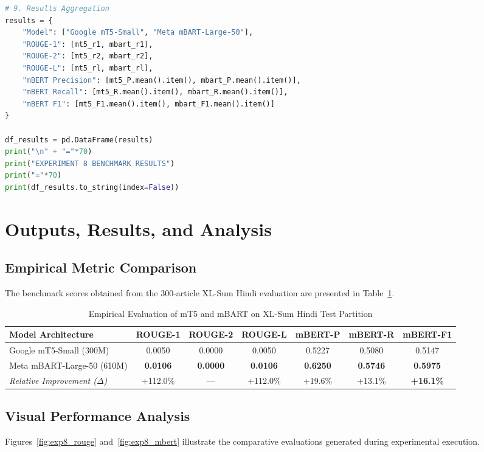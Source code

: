 \documentclass[12pt,a4paper]{report}
\begin{document}
\begin{lstlisting}[language=Python, caption={Complete Implementation of Experiment 8: Hindi Abstractive Summarization with mT5 and mBART}, label={lst:exp8_full}]
# 9. Results Aggregation
results = {
    "Model": ["Google mT5-Small", "Meta mBART-Large-50"],
    "ROUGE-1": [mt5_r1, mbart_r1],
    "ROUGE-2": [mt5_r2, mbart_r2],
    "ROUGE-L": [mt5_rl, mbart_rl],
    "mBERT Precision": [mt5_P.mean().item(), mbart_P.mean().item()],
    "mBERT Recall": [mt5_R.mean().item(), mbart_R.mean().item()],
    "mBERT F1": [mt5_F1.mean().item(), mbart_F1.mean().item()]
}

df_results = pd.DataFrame(results)
print("\n" + "="*70)
print("EXPERIMENT 8 BENCHMARK RESULTS")
print("="*70)
print(df_results.to_string(index=False))
\end{lstlisting}

\section{Outputs, Results, and Analysis}
\subsection{Empirical Metric Comparison}
The benchmark scores obtained from the 300-article XL-Sum Hindi evaluation are presented in Table~\ref{tab:exp8_results}.

\begin{table}[H]
\centering
\caption{Empirical Evaluation of mT5 and mBART on XL-Sum Hindi Test Partition}
\label{tab:exp8_results}
\begin{tabular}{lcccccc}
\toprule
\textbf{Model Architecture} & \textbf{ROUGE-1} & \textbf{ROUGE-2} & \textbf{ROUGE-L} & \textbf{mBERT-P} & \textbf{mBERT-R} & \textbf{mBERT-F1} \\
\midrule
Google mT5-Small (300M) & 0.0050 & 0.0000 & 0.0050 & 0.5227 & 0.5080 & 0.5147 \\
Meta mBART-Large-50 (610M) & \textbf{0.0106} & \textbf{0.0000} & \textbf{0.0106} & \textbf{0.6250} & \textbf{0.5746} & \textbf{0.5975} \\
\midrule
\textit{Relative Improvement ($\Delta$)} & +112.0\% & --- & +112.0\% & +19.6\% & +13.1\% & \textbf{+16.1\%} \\
\bottomrule
\end{tabular}
\end{table}

\subsection{Visual Performance Analysis}
Figures~\ref{fig:exp8_rouge} and~\ref{fig:exp8_mbert} illustrate the comparative evaluations generated during experimental execution.
\end{document}
